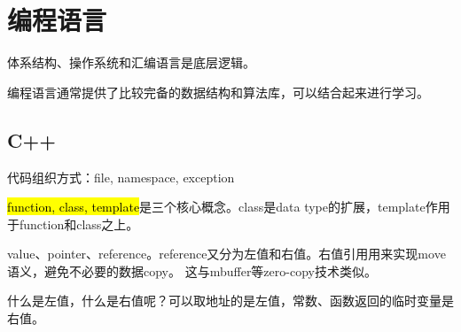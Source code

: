 \chapter{编程语言}

体系结构、操作系统和汇编语言是底层逻辑。

编程语言通常提供了比较完备的数据结构和算法库，可以结合起来进行学习。

\section{C++}

代码组织方式：file, namespace, exception

\hl{function, class, template}是三个核心概念。class是data type的扩展，template作用于function和class之上。

value、pointer、reference。reference又分为左值和右值。右值引用用来实现move语义，避免不必要的数据copy。
这与mbuffer等zero-copy技术类似。

什么是左值，什么是右值呢？可以取地址的是左值，常数、函数返回的临时变量是右值。
